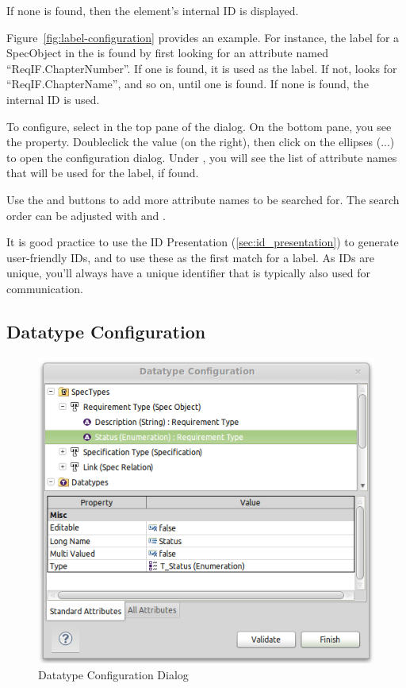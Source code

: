 If none is found, then the element's internal ID is displayed.

Figure~\ref{fig:label-configuration} provides an example. For instance, the label for a SpecObject in the  is found by first looking for an attribute named ``ReqIF.ChapterNumber''. If one is found, it is used as the label. If not, \pror{} looks for ``ReqIF.ChapterName'', and so on, until one is found. If none is found, the internal ID is used.

To configure, select  in the top pane of the dialog.  On the bottom pane, you see the  property.  Doubleclick the value (on the right), then click on the ellipses (...) to open the configuration dialog.  Under , you will see the list of attribute names that will be used for the label, if found.

Use the  and  buttons to add more attribute names to be searched for.  The
search order can be adjusted with  and .

\begin{info}
It is good practice to use the ID Presentation (\ref{sec:id_presentation}) to generate
user-friendly IDs, and to use these as the first match for a label.  As IDs are unique, you'll always
have a unique identifier that is typically also used for communication.
\end{info}

\subsection{Datatype Configuration}
\label{sec:datatype_configuration}

\begin{figure}
\centering     
\includegraphics[width=0.8\linewidth]{../rmf-images/pror_datatype_configuration.png}
\caption{Datatype Configuration Dialog}      
\label{fig:DatatypeConfig}
\end{figure}

